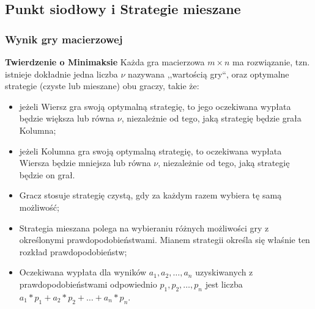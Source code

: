 \documentclass[8pt, brown]{beamer}
\begin{document}
		\subsection{Punkt siodłowy i Strategie mieszane}
		\begin{frame}
			\frametitle{Wynik gry macierzowej}
			\begin{block}{\textbf{Twierdzenie o Minimaksie}}
				Każda gra macierzowa $m \times n$ ma rozwiązanie, tzn. istnieje dokładnie jedna liczba $\nu$ nazywana ,,wartością gry``, oraz optymalne strategie (czyste lub mieszane) obu graczy, takie że:
				\begin{itemize}
				 \item jeżeli Wiersz gra swoją optymalną strategię, to jego oczekiwana wypłata będzie większa lub równa $\nu$, niezależnie od tego, jaką strategię będzie grała Kolumna;
				 \item jeżeli Kolumna gra swoją optymalną strategię, to oczekiwana wypłata Wiersza będzie mniejsza lub równa $\nu$, niezależnie od tego, jaką strategię będzie on grał.
				\end{itemize}

			\end{block}
			\begin{itemize}
			 \item Gracz stosuje strategię czystą, gdy za każdym razem wybiera tę samą możliwość;
			 \item Strategia mieszana polega na wybieraniu różnych możliwości gry z określonymi prawdopodobieństwami. Mianem strategii określa się właśnie ten rozkład prawdopodobieństw;
			 \item Oczekiwana wypłata dla wyników $a_1, a_2, \dots, a_n$ uzyskiwanych z prawdopodobieństwami odpowiednio $p_1, p_2, \dots, p_n$ jest liczba $a_1 * p_1 + a_2 * p_2 + \dots + a_n * p_n$.
			\end{itemize}
		\end{frame}
		
\end{document}

